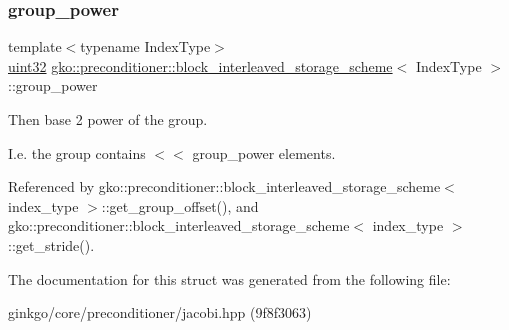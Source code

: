 \subsubsection{\texorpdfstring{group\+\_\+power}{group\_power}}
{\footnotesize\ttfamily template$<$typename Index\+Type$>$ \\
\hyperlink{namespacegko_a318c831e3fe269ba04c6ed8bf5a71073}{uint32} \hyperlink{structgko_1_1preconditioner_1_1block__interleaved__storage__scheme}{gko\+::preconditioner\+::block\+\_\+interleaved\+\_\+storage\+\_\+scheme}$<$ Index\+Type $>$\+::group\+\_\+power}



Then base 2 power of the group. 

I.\+e. the group contains { $<$$<$ group\+\_\+power} elements. 

Referenced by gko\+::preconditioner\+::block\+\_\+interleaved\+\_\+storage\+\_\+scheme$<$ index\+\_\+type $>$\+::get\+\_\+group\+\_\+offset(), and gko\+::preconditioner\+::block\+\_\+interleaved\+\_\+storage\+\_\+scheme$<$ index\+\_\+type $>$\+::get\+\_\+stride().



The documentation for this struct was generated from the following file\+:\begin{DoxyCompactItemize}
\item 
ginkgo/core/preconditioner/jacobi.\+hpp (9f8f3063)\end{DoxyCompactItemize}
